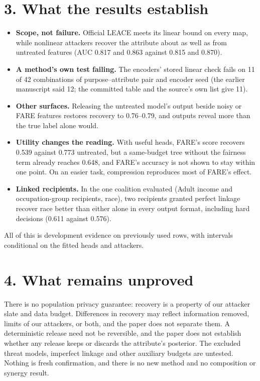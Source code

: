\documentclass[10pt]{article}
\begin{document}
\section*{3. What the results establish}
\begin{itemize}
\item \textbf{Scope, not failure.} Official LEACE meets its linear bound on every map, while nonlinear attackers recover
the attribute about as well as from untreated features (AUC 0.817 and 0.863 against 0.815 and 0.870).
\item \textbf{A method's own test failing.} The encoders' stored linear check fails on 11 of 42 combinations of purpose--attribute pair and encoder seed (the earlier manuscript said 12; the committed table and the source's own list give 11).
\item \textbf{Other surfaces.} Releasing the untreated model's output beside noisy or FARE features restores recovery
to 0.76--0.79, and outputs reveal more than the true label alone would.
\item \textbf{Utility changes the reading.} With useful heads, FARE's score recovers 0.539 against 0.773 untreated, but a
same-budget tree without the fairness term already reaches 0.648, and FARE's accuracy is not shown to stay within one
point. On an easier task, compression reproduces most of FARE's effect.
\item \textbf{Linked recipients.} In the one coalition evaluated (Adult income and occupation-group recipients, race),
two recipients granted perfect linkage recover race better than either alone in every output format, including hard
decisions (0.611 against 0.576).
\end{itemize}
All of this is development evidence on previously used rows, with intervals conditional on the fitted heads and
attackers.

\section*{4. What remains unproved}
There is no population privacy guarantee: recovery is a property of our attacker slate and data budget. Differences in
recovery may reflect information removed, limits of our attackers, or both, and the paper does not separate them. A
deterministic release need not be reversible, and the paper does not establish whether any release keeps or discards
the attribute's posterior. The excluded threat models, imperfect linkage and other auxiliary budgets are untested.
Nothing is fresh confirmation, and there is no new method and no composition or synergy result.
\end{document}
